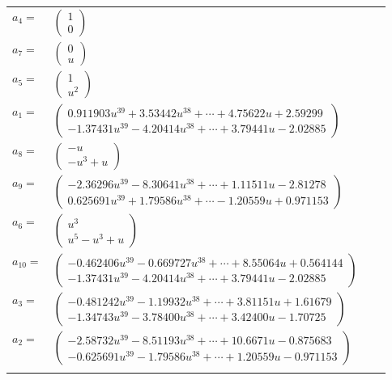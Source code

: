 \documentclass[1p]{elsarticle_modified}
\theoremstyle{definition}
\begin{document}
\begin{tabular}{m{7pt} m{180pt} m{7pt} m{180pt} }
\flushright $a_{4}=$&$\begin{pmatrix}1\\0\end{pmatrix}$ \\
\flushright $a_{7}=$&$\begin{pmatrix}0\\u\end{pmatrix}$ \\
\flushright $a_{5}=$&$\begin{pmatrix}1\\u^2\end{pmatrix}$ \\
\flushright $a_{1}=$&$\begin{pmatrix}0.911903 u^{39}+3.53442 u^{38}+\cdots+4.75622 u+2.59299\\-1.37431 u^{39}-4.20414 u^{38}+\cdots+3.79441 u-2.02885\end{pmatrix}$ \\
\flushright $a_{8}=$&$\begin{pmatrix}- u\\- u^3+u\end{pmatrix}$ \\
\flushright $a_{9}=$&$\begin{pmatrix}-2.36296 u^{39}-8.30641 u^{38}+\cdots+1.11511 u-2.81278\\0.625691 u^{39}+1.79586 u^{38}+\cdots-1.20559 u+0.971153\end{pmatrix}$ \\
\flushright $a_{6}=$&$\begin{pmatrix}u^3\\u^5- u^3+u\end{pmatrix}$ \\
\flushright $a_{10}=$&$\begin{pmatrix}-0.462406 u^{39}-0.669727 u^{38}+\cdots+8.55064 u+0.564144\\-1.37431 u^{39}-4.20414 u^{38}+\cdots+3.79441 u-2.02885\end{pmatrix}$ \\
\flushright $a_{3}=$&$\begin{pmatrix}-0.481242 u^{39}-1.19932 u^{38}+\cdots+3.81151 u+1.61679\\-1.34743 u^{39}-3.78400 u^{38}+\cdots+3.42400 u-1.70725\end{pmatrix}$ \\
\flushright $a_{2}=$&$\begin{pmatrix}-2.58732 u^{39}-8.51193 u^{38}+\cdots+10.6671 u-0.875683\\-0.625691 u^{39}-1.79586 u^{38}+\cdots+1.20559 u-0.971153\end{pmatrix}$\\&\end{tabular}
\end{document}
